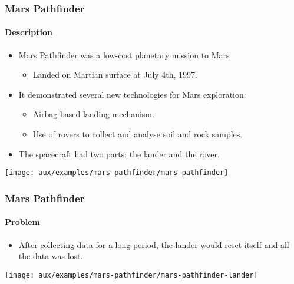 \begin{frame}[hasprev=false, hasnext=true]
\label{example:mars-pathfinder}
\frametitle{Mars Pathfinder}
\framesubtitle{Description}

\begin{itemize}
	\item Mars Pathfinder was a low-cost planetary mission to Mars
	\begin{itemize}
		\item Landed on Martian surface at July 4th, 1997.
	\end{itemize}

	\item It demonstrated several new technologies for Mars exploration:
	\begin{itemize}
		\item Airbag-based landing mechanism.
		\item Use of rovers to collect and analyse soil and rock samples.
	\end{itemize}

	\item The spacecraft had two parts: the lander and the rover.
\end{itemize}

\begin{block:ie}{}
	\centering
	\texttt{[image: aux/examples/mars-pathfinder/mars-pathfinder]}
\end{block:ie}
\end{frame}


\begin{frame}[hasprev=true, hasnext=true]
\frametitle{Mars Pathfinder}
\framesubtitle{Problem}

\begin{itemize}
	\item After collecting data for a long period, the lander would reset
	itself and all the data was lost.
\end{itemize}

\begin{block:ie}{}
	\centering
	\texttt{[image: aux/examples/mars-pathfinder/mars-pathfinder-lander]}
\end{block:ie}
\end{frame}


